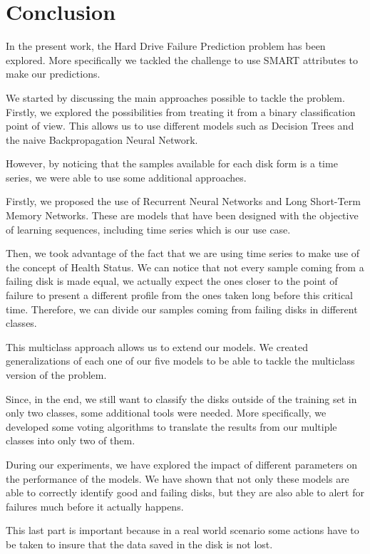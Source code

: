 \chapter{Conclusion}\label{chap:conclusion}

In the present work, the Hard Drive Failure Prediction problem has been explored.
More specifically we tackled the challenge to use SMART attributes to make our predictions.

We started by discussing the main approaches possible to tackle the problem.
Firstly, we explored the possibilities from treating it from a binary classification point of view.
This allows us to use different models such as Decision Trees and the naive Backpropagation Neural Network.

However, by noticing that the samples available for each disk form is a time series, we were able to use some additional approaches.

Firstly, we proposed the use of Recurrent Neural Networks and Long Short-Term Memory Networks.
These are models that have been designed with the objective of learning sequences, including time series which is our use case.

Then, we took advantage of the fact that we are using time series to make use of the concept of Health Status.
We can notice that not every sample coming from a failing disk is made equal, we actually expect the ones closer to the point of failure to present a different profile from the ones taken long before this critical time.
Therefore, we can divide our samples coming from failing disks in different classes.

This multiclass approach allows us to extend our models.
We created generalizations of each one of our five models to be able to tackle the multiclass version of the problem.

Since, in the end, we still want to classify the disks outside of the training set in only two classes, some additional tools were needed.
More specifically, we developed some voting algorithms to translate the results from our multiple classes into only two of them.

During our experiments, we have explored the impact of different parameters on the performance of the models.
We have shown that not only these models are able to correctly identify good and failing disks, but they are also able to alert for failures much before it actually happens.

This last part is important because in a real world scenario some actions have to be taken to insure that the data saved in the disk is not lost.

